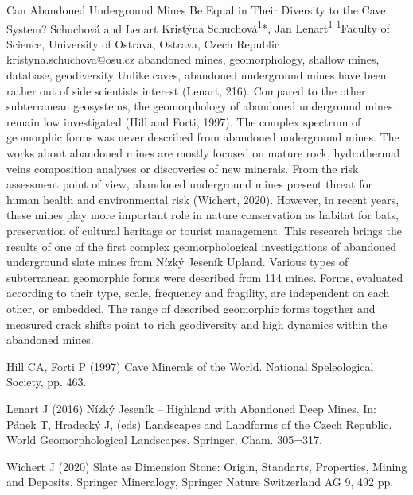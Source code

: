 \abstract
{Can Abandoned Underground Mines Be Equal in Their Diversity to the Cave System?} 
{Schuchová and Lenart} 
{Kristýna Schuchová\textsuperscript{1}*, Jan Lenart\textsuperscript{1}} 
{\TLtag} 
{
	\textsuperscript{1}Faculty of Science, University of Ostrava, Ostrava, Czech Republic
}
{kristyna.schuchova@osu.cz}  %
{abandoned mines, geomorphology, shallow mines, database, geodiversity}
{Unlike caves, abandoned underground mines have been rather out of side scientists interest (Lenart, 216). Compared to the other subterranean geosystems, the geomorphology of abandoned underground mines remain low investigated (Hill and Forti, 1997). The complex spectrum of geomorphic forms was never described from abandoned underground mines. The works about abandoned mines are mostly focused on mature rock, hydrothermal veins composition analyses or discoveries of new minerals. From the risk assessment point of view, abandoned underground mines present threat for human health and environmental risk (Wichert, 2020). However, in recent years, these mines play more important role in nature conservation as habitat for bats, preservation of cultural heritage or tourist management. This research brings the results of one of the first complex geomorphological investigations of abandoned underground slate mines from Nízký Jeseník Upland. Various types of subterranean geomorphic forms were described from 114 mines. Forms, evaluated according to their type, scale, frequency and fragility, are independent on each other, or embedded. The range of described geomorphic forms together and measured crack shifts point to rich geodiversity and high dynamics within the abandoned mines.
}
{Hill CA, Forti P (1997) Cave Minerals of the World. National Speleological Society, pp. 463. 

Lenart J (2016) Nízký Jeseník – Highland with Abandoned Deep Mines. In: Pánek T, Hradecký J, (eds) Landscapes and Landforms of the Czech Republic. World Geomorphological Landscapes. Springer, Cham. 305¬317. 

Wichert J (2020) Slate as Dimension Stone: Origin, Standarts, Properties, Mining and Deposits. Springer Mineralogy, Springer Nature Switzerland AG 9, 492 pp. 
}
